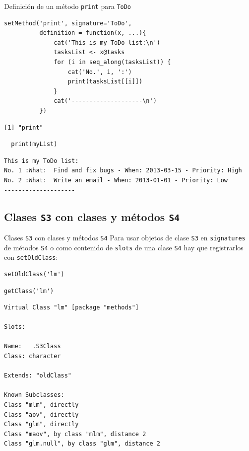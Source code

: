 \documentclass[xcolor={usenames,svgnames,dvipsnames}]{beamer}
\begin{document}
\begin{frame}[fragile,label={sec:orgheadline35}]{Definición de un método \texttt{print} para \texttt{ToDo}}
 \lstset{language=R,label= ,caption= ,captionpos=b,numbers=none}
\begin{lstlisting}
setMethod('print', signature='ToDo',
          definition = function(x, ...){
              cat('This is my ToDo list:\n')
              tasksList <- x@tasks
              for (i in seq_along(tasksList)) {
                  cat('No.', i, ':')
                  print(tasksList[[i]])
              }
              cat('--------------------\n')
          })
\end{lstlisting}

\begin{verbatim}
[1] "print"
\end{verbatim}

\lstset{language=R,label= ,caption= ,captionpos=b,numbers=none}
\begin{lstlisting}
  print(myList)
\end{lstlisting}

\begin{verbatim}
This is my ToDo list:
No. 1 :What:  Find and fix bugs - When: 2013-03-15 - Priority: High 
No. 2 :What:  Write an email - When: 2013-01-01 - Priority: Low 
--------------------
\end{verbatim}
\end{frame}

\subsection{Clases \texttt{S3} con clases y métodos \texttt{S4}}
\label{sec:orgheadline41}

\begin{frame}[fragile,label={sec:orgheadline37}]{Clases \texttt{S3} con clases y métodos \texttt{S4}}
 Para usar objetos de clase \texttt{S3} en \texttt{signatures} de métodos \texttt{S4} o
como contenido de \texttt{slots} de una clase \texttt{S4} hay que registrarlos con
\texttt{setOldClass}:
\lstset{language=R,label= ,caption= ,captionpos=b,numbers=none}
\begin{lstlisting}
setOldClass('lm')
\end{lstlisting}

\lstset{language=R,label= ,caption= ,captionpos=b,numbers=none}
\begin{lstlisting}
getClass('lm')
\end{lstlisting}

\begin{verbatim}
Virtual Class "lm" [package "methods"]

Slots:
                
Name:   .S3Class
Class: character

Extends: "oldClass"

Known Subclasses: 
Class "mlm", directly
Class "aov", directly
Class "glm", directly
Class "maov", by class "mlm", distance 2
Class "glm.null", by class "glm", distance 2
\end{verbatim}
\end{frame}
\end{document}
